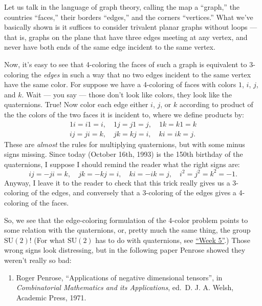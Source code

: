 \documentclass[12pt]{article}
\def\tightlist{}
\begin{document}
Let us talk in the language of graph theory, calling the map a
``graph,'' the countries ``faces,'' their borders ``edges,'' and the
corners ``vertices.'' What we've basically shown is it suffices to
consider trivalent planar graphs without loops --- that is, graphs on
the plane that have three edges meeting at any vertex, and never have
both ends of the same edge incident to the same vertex.

Now, it's easy to see that 4-coloring the faces of such a graph is
equivalent to 3-coloring the \emph{edges} in such a way that no two
edges incident to the same vertex have the same color. For suppose we
have a 4-coloring of faces with colors \(1\), \(i\), \(j\), and \(k\).
Wait --- you say --- those don't look like colors, they look like the
quaternions. True! Now color each edge either \(i\), \(j\), or \(k\)
according to product of the the colors of the two faces it is incident
to, where we define products by:
\[\begin{gathered}1i = i1 = i, \quad 1j = j1 = j, \quad 1k = k1 = k \\ ij = ji = k, \quad jk = kj = i, \quad ki = ik = j.\end{gathered}\]
These are \emph{almost} the rules for multiplying quaternions, but with
some minus signs missing. Since today (October 16th, 1993) is the 150th
birthday of the quaternions, I suppose I should remind the reader what
the right signs are:
\[ij = -ji = k, \quad jk = -kj = i, \quad  ki = -ik = j, \quad i^2 = j^2 = k^2 = -1.\]
Anyway, I leave it to the reader to check that this trick really gives
us a 3-coloring of the edges, and conversely that a 3-coloring of the
edges gives a 4-coloring of the faces.

So, we see that the edge-coloring formulation of the 4-color problem
points to some relation with the quaternions, or, pretty much the same
thing, the group \(\mathrm{SU}(2)\)! (For what \(\mathrm{SU}(2)\) has to
do with quaternions, see \protect\hyperlink{week5}{``Week 5''}.) Those
wrong signs look distressing, but in the following paper Penrose showed
they weren't really so bad:

\begin{enumerate}
\def\labelenumi{\arabic{enumi})}
\setcounter{enumi}{3}
\tightlist
\item
   Roger Penrose, ``Applications of negative dimensional tensors'', in
  \emph{Combinatorial Mathematics and its Applications}, ed.~D. J. A.
  Welsh, Academic Press, 1971.
\end{enumerate}
\end{document}
